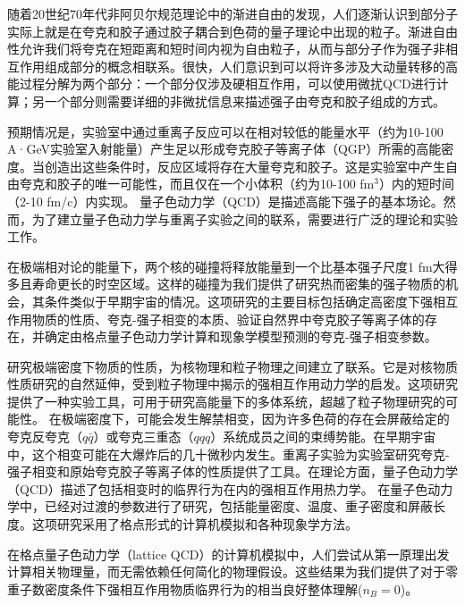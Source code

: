 \iffalse


随着20世纪70年代非阿贝尔规范理论中的渐进自由的发现，人们逐渐认识到部分子实际上就是在夸克和胶子通过胶子耦合到色荷的量子理论中出现的粒子。渐进自由性允许我们将夸克在短距离和短时间内视为自由粒子，从而与部分子作为强子非相互作用组成部分的概念相联系。很快，人们意识到可以将许多涉及大动量转移的高能过程分解为两个部分：一个部分仅涉及硬相互作用，可以使用微扰QCD进行计算；另一个部分则需要详细的非微扰信息来描述强子由夸克和胶子组成的方式。


预期情况是，实验室中通过重离子反应可以在相对较低的能量水平（约为10-100 A·GeV实验室入射能量）产生足以形成夸克胶子等离子体（QGP）所需的高能密度。当创造出这些条件时，反应区域将存在大量夸克和胶子。这是实验室中产生自由夸克和胶子的唯一可能性，而且仅在一个小体积（约为10-100 fm$^3$）内的短时间（2-10 fm/c）内实现。
量子色动力学（QCD）是描述高能下强子的基本场论。然而，为了建立量子色动力学与重离子实验之间的联系，需要进行广泛的理论和实验工作。

在极端相对论的能量下，两个核的碰撞将释放能量到一个比基本强子尺度1 fm大得多且寿命更长的时空区域。这样的碰撞为我们提供了研究热而密集的强子物质的机会，其条件类似于早期宇宙的情况。这项研究的主要目标包括确定高密度下强相互作用物质的性质、夸克-强子相变的本质、验证自然界中夸克胶子等离子体的存在，并确定由格点量子色动力学计算和现象学模型预测的夸克-强子相变参数。

研究极端密度下物质的性质，为核物理和粒子物理之间建立了联系。它是对核物质性质研究的自然延伸，受到粒子物理中揭示的强相互作用动力学的启发。这项研究提供了一种实验工具，可用于研究高能量下的多体系统，超越了粒子物理研究的可能性。
在极端密度下，可能会发生解禁相变，因为许多色荷的存在会屏蔽给定的夸克反夸克（$q\bar{q}$）或夸克三重态（$qqq$）系统成员之间的束缚势能。在早期宇宙中，这个相变可能在大爆炸后的几十微秒内发生。重离子实验为实验室研究夸克-强子相变和原始夸克胶子等离子体的性质提供了工具。在理论方面，量子色动力学（QCD）描述了包括相变时的临界行为在内的强相互作用热力学。
在量子色动力学中，已经对过渡的参数进行了研究，包括能量密度、温度、重子密度和屏蔽长度。这项研究采用了格点形式的计算机模拟和各种现象学方法。

在格点量子色动力学（lattice QCD）的计算机模拟中，人们尝试从第一原理出发计算相关物理量，而无需依赖任何简化的物理假设。这些结果为我们提供了对于零重子数密度条件下强相互作用物质临界行为的相当良好整体理解($n_B = 0$)。

